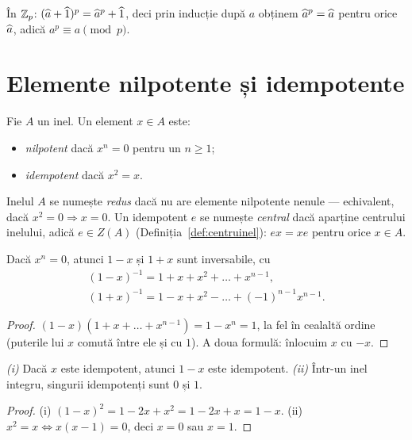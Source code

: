 \begin{aplicatie}
În $\mathbb{Z}_p$: $(\widehat{a}+\widehat{1})^p=\widehat{a}^p+\widehat{1}$, deci prin inducție după $a$ obținem $\widehat{a}^p=\widehat{a}$ pentru orice $\widehat{a}$, adică $a^p\equiv a\pmod p$.
\end{aplicatie}

\section{Elemente nilpotente și idempotente}

\begin{definitie}
Fie $A$ un inel. Un element $x\in A$ este:
\begin{itemize}[nosep,leftmargin=1.4em]
\item \emph{nilpotent} dacă $x^n=0$ pentru un $n\ge1$;
\item \emph{idempotent} dacă $x^2=x$.
\end{itemize}
Inelul $A$ se numește \emph{redus} dacă nu are elemente nilpotente nenule --- echivalent, dacă $x^2=0\Rightarrow x=0$. Un idempotent $e$ se numește \emph{central} dacă aparține centrului inelului, adică $e\in Z(A)$ (Definiția~\ref{def:centruinel}): $ex=xe$ pentru orice $x\in A$.
\end{definitie}

\begin{propozitie}\label{prop:nilpotent}
Dacă $x^n=0$, atunci $1-x$ și $1+x$ sunt inversabile, cu
\[
\begin{gathered}
(1-x)^{-1}=1+x+x^2+\dots+x^{n-1},\\
(1+x)^{-1}=1-x+x^2-\dots+(-1)^{n-1}x^{n-1}.
\end{gathered}
\]
\end{propozitie}

\begin{proof}
$(1-x)(1+x+\dots+x^{n-1})=1-x^n=1$, la fel în cealaltă ordine (puterile lui $x$ comută între ele și cu $1$). A doua formulă: înlocuim $x$ cu $-x$.
\end{proof}

\begin{propozitie}\label{prop:idempotent}
\emph{(i)} Dacă $x$ este idempotent, atunci $1-x$ este idempotent. \emph{(ii)} Într-un inel integru, singurii idempotenți sunt $0$ și $1$.
\end{propozitie}

\begin{proof}
(i) $(1-x)^2=1-2x+x^2=1-2x+x=1-x$. (ii) $x^2=x\iff x(x-1)=0$, deci $x=0$ sau $x=1$.
\end{proof}


